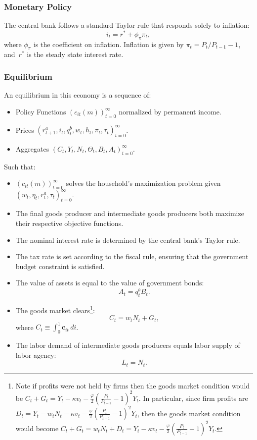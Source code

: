 \subsubsection{Monetary Policy}

The central bank follows a standard Taylor rule that responds solely to inflation:
$$i_{t} = r^{*} +\phi_{\pi} \pi_{t},$$ 
where $\phi_{\pi}$ is the coefficient on inflation. Inflation is given by $\pi_t = P_t/P_{t-1}-1$, and~$r^{*}$ is the steady state interest rate. 

\subsubsection{Equilibrium}

An equilibrium in this economy is a sequence of: 
\begin{itemize}[label=--]
	\item Policy Functions $\left( c_{it}(m) \right )_{t=0}^{\infty}$ normalized by permanent income.
	\item Prices $ \left( r^{a}_{t+1}, i_{t}, q^{b}_{t},  w_{t}, h_{t} , \pi_{t} , \tau_{t} \right) _{t=0}^{\infty}$.
	\item Aggregates $ \left(C_{t}, Y_{t} , N_{t},   \Theta_{t},  B_{t} , A_{t}  \right)_{t=0}^{\infty}$.
\end{itemize}

Such that: 
\begin{itemize}[label=--]
\item $\left(c_{it}(m)\right)_{t=0}^{\infty}$  solves the household's maximization problem given $\left( w_{t}, \eta_{t},  r^{a}_{t} , \tau_{t} \right)_{t=0}^{\infty}$.
\item The final goods producer and intermediate goods producers both maximize their respective objective functions.
\item The nominal interest rate is determined by the central bank's Taylor rule.
\item The tax rate is set according to the fiscal rule, ensuring that the government budget constraint is satisfied.
\item The value of assets is equal to the value of government bonds:
 $$A_t =  q^{b}_{t}B_{t}.$$
\item The goods market clears\footnote{Note if profits were not held by firms then the goods market condition would be $ C_{t}  + G_{t}  = Y_{t} -  \kappa v_{t} - \frac{\varphi}{2}\left( \frac{P_{t}}{P_{t-1}} - 1\right)^{2} Y_{t}  $.  In particular, since firm profits are $D_{t} = Y_{t} -  w_{t} N_{t}  - \kappa v_{t} - \frac{\varphi}{2}\left( \frac{P_{t}}{P_{t-1}} - 1\right)^{2} Y_{t} $, then the goods market condition would become $ C_{t}  + G_{t}  =w_{t} N_{t}  + D_{t} = Y_{t} -  \kappa v_{t} - \frac{\varphi}{2}\left( \frac{P_{t}}{P_{t-1}} - 1\right)^{2} Y_{t}  $. }: 
$$ C_{t}  = w_{t} N_{t}  + G_{t},$$
where $C_{t} \equiv  \int_{0}^{1} \textbf{c}_{it} \, di$. 
\item The labor demand of intermediate goods producers equals labor supply of labor agency:
$$ L_{t} =  N_{t}.$$ 
\end{itemize}

